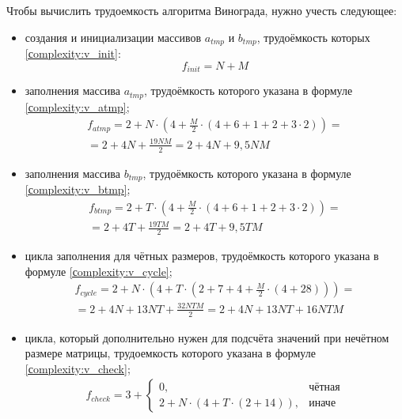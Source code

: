 Чтобы вычислить трудоемкость алгоритма Винограда, нужно учесть следующее:
\begin{itemize}
	\item создания и инициализации массивов $a_{tmp}$ и $b_{tmp}$, трудоёмкость которых \ref{сomplexity:v_init}:
	\begin{equation}
		\label{сomplexity:v_init}
		f_{init} = N + M
	\end{equation}
	\item заполнения массива $a_{tmp}$, трудоёмкость которого указана в формуле \ref{сomplexity:v_atmp};
	\begin{equation}
		\label{сomplexity:v_atmp}
		\begin{aligned}
			f_{atmp} = 2 + N \cdot (4 + \frac{M}{2} \cdot (4 + 6 + 1 + 2 + 3 \cdot 2)) = \\
			= 2 + 4N + \frac{19NM}{2} = 2 + 4N + 9,5NM
		\end{aligned} 
	\end{equation}
	\item заполнения массива $b_{tmp}$, трудоёмкость которого указана в формуле \ref{сomplexity:v_btmp};
	\begin{equation}
		\label{сomplexity:v_btmp}
		\begin{aligned}
			f_{btmp} = 2 + T \cdot (4 + \frac{M}{2} \cdot (4 + 6 + 1 + 2 + 3 \cdot 2)) = \\
			= 2 + 4T + \frac{19TM}{2} = 2 + 4T + 9,5TM
		\end{aligned}  
	\end{equation}
	\item цикла заполнения для чётных размеров, трудоёмкость которого указана в формуле \ref{сomplexity:v_cycle};
	\begin{equation}
		\label{сomplexity:v_cycle}
		\begin{aligned}
			f_{cycle} = 2 + N \cdot (4 + T \cdot (2 + 7 + 4 + \frac{M}{2} \cdot (4 + 28))) = \\
			= 2 + 4N + 13NT + \frac{32NTM}{2}  = 2 + 4N + 13NT + 16NTM 
		\end{aligned}
	\end{equation}
	\item цикла, который дополнительно нужен для подсчёта значений при нечётном размере матрицы, трудоемкость которого указана в формуле \ref{сomplexity:v_check};
	\begin{equation}
		\label{сomplexity:v_check}
		\begin{aligned}
			f_{check} = 3 + 
			\begin{cases}
				0, & \text{чётная} \\
				2 + N \cdot (4 + T \cdot (2 + 14)), & \text{иначе}
			\end{cases}
		\end{aligned}  
	\end{equation}
\end{itemize}


